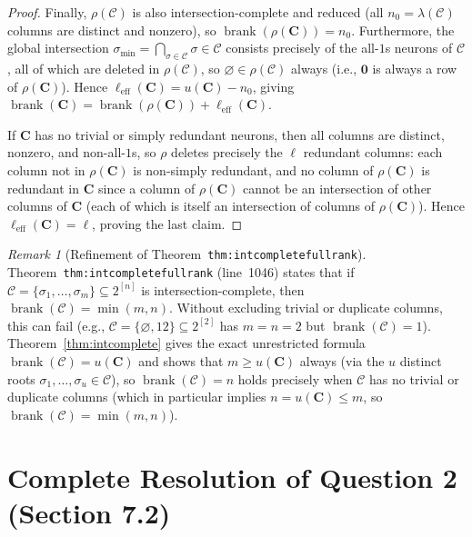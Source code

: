\documentclass[11pt]{article}
\theoremstyle{plain}
\theoremstyle{definition}
\theoremstyle{remark}
\newtheorem{remark}[theorem]{Remark}
\DeclareMathOperator{\brank}{brank}
\begin{document}
\begin{proof}
Finally, $\rho(\mathcal{C})$ is also intersection-complete and reduced (all $n_0 = \lambda(\mathcal{C})$ columns are distinct and nonzero), so $\brank(\rho(\mathbf{C})) = n_0$. Furthermore, the global intersection $\sigma_{\min} = \bigcap_{\sigma \in \mathcal{C}} \sigma \in \mathcal{C}$ consists precisely of the all-$1$s neurons of $\mathcal{C}$, all of which are deleted in $\rho(\mathcal{C})$, so $\varnothing \in \rho(\mathcal{C})$ always (i.e., $\mathbf{0}$ is always a row of $\rho(\mathbf{C})$). Hence $\ell_{\mathrm{eff}}(\mathbf{C}) = u(\mathbf{C}) - n_0$, giving $\brank(\mathbf{C}) = \brank(\rho(\mathbf{C})) + \ell_{\mathrm{eff}}(\mathbf{C})$.

If $\mathbf{C}$ has no trivial or simply redundant neurons, then all columns are distinct, nonzero, and non-all-$1$s, so $\rho$ deletes precisely the $\ell$ redundant columns: each column not in $\rho(\mathbf{C})$ is non-simply redundant, and no column of $\rho(\mathbf{C})$ is redundant in $\mathbf{C}$ since a column of $\rho(\mathbf{C})$ cannot be an intersection of other columns of $\mathbf{C}$ (each of which is itself an intersection of columns of $\rho(\mathbf{C})$). Hence $\ell_{\mathrm{eff}}(\mathbf{C}) = \ell$, proving the last claim.
\end{proof}

\begin{remark}[Refinement of Theorem~\texttt{thm:intcompletefullrank}]\label{rmk:intcomplete}
Theorem~\texttt{thm:\allowbreak intcomplete\allowbreak fullrank} (line~1046) states that if $\mathcal{C} = \{\sigma_1, \dots, \sigma_m\} \subseteq 2^{[n]}$ is intersection-complete, then $\brank(\mathcal{C}) = \min(m, n)$. Without excluding trivial or duplicate columns, this can fail (e.g., $\mathcal{C} = \{\varnothing, 12\} \subseteq 2^{[2]}$ has $m = n = 2$ but $\brank(\mathcal{C}) = 1$). Theorem~\ref{thm:intcomplete} gives the exact unrestricted formula $\brank(\mathcal{C}) = u(\mathbf{C})$ and shows that $m \ge u(\mathbf{C})$ always (via the $u$ distinct roots $\sigma_1, \dots, \sigma_u \in \mathcal{C}$), so $\brank(\mathcal{C}) = n$ holds precisely when $\mathcal{C}$ has no trivial or duplicate columns (which in particular implies $n = u(\mathbf{C}) \le m$, so $\brank(\mathcal{C}) = \min(m, n)$).
\end{remark}

\section{Complete Resolution of Question 2 (Section 7.2)}
\end{document}
